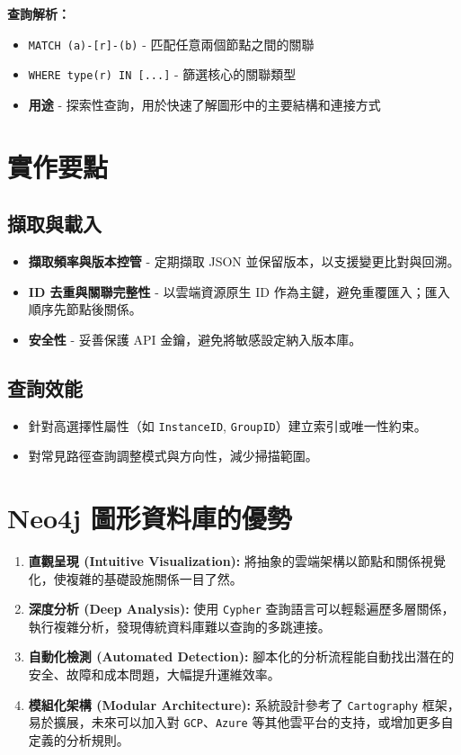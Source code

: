 \documentclass[11pt,a4paper]{ctexart}
\begin{document}
\textbf{查詢解析：}
\begin{itemize}[leftmargin=1.5em]
\item \texttt{MATCH (a)-[r]-(b)} - 匹配任意兩個節點之間的關聯
\item \texttt{WHERE type(r) IN [...]} - 篩選核心的關聯類型
\item \textbf{用途} - 探索性查詢，用於快速了解圖形中的主要結構和連接方式
\end{itemize}

\section{實作要點}
\subsection{擷取與載入}
\begin{itemize}[leftmargin=1.5em]
\item \textbf{擷取頻率與版本控管} - 定期擷取 JSON 並保留版本，以支援變更比對與回溯。
\item \textbf{ID 去重與關聯完整性} - 以雲端資源原生 ID 作為主鍵，避免重覆匯入；匯入順序先節點後關係。
\item \textbf{安全性} - 妥善保護 API 金鑰，避免將敏感設定納入版本庫。
\end{itemize}

\subsection{查詢效能}
\begin{itemize}[leftmargin=1.5em]
\item 針對高選擇性屬性（如 \texttt{InstanceID}, \texttt{GroupID}）建立索引或唯一性約束。
\item 對常見路徑查詢調整模式與方向性，減少掃描範圍。
\end{itemize}

\section{Neo4j 圖形資料庫的優勢}

\begin{enumerate}[leftmargin=1.5em]
\item \textbf{直觀呈現 (Intuitive Visualization):} 將抽象的雲端架構以節點和關係視覺化，使複雜的基礎設施關係一目了然。

\item \textbf{深度分析 (Deep Analysis):} 使用 \texttt{Cypher} 查詢語言可以輕鬆遍歷多層關係，執行複雜分析，發現傳統資料庫難以查詢的多跳連接。

\item \textbf{自動化檢測 (Automated Detection):} 腳本化的分析流程能自動找出潛在的安全、故障和成本問題，大幅提升運維效率。

\item \textbf{模組化架構 (Modular Architecture):} 系統設計參考了 \texttt{Cartography} 框架，易於擴展，未來可以加入對 \texttt{GCP}、\texttt{Azure} 等其他雲平台的支持，或增加更多自定義的分析規則。
\end{enumerate}
\end{document}
